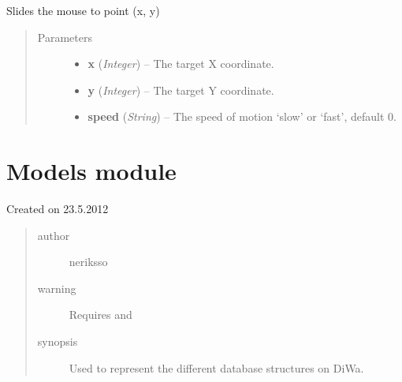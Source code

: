 \documentclass[letterpaper,10pt,english]{sphinxmanual}
\begin{document}

\begin{fulllineitems}
\label{macro:macro.SlideTo}
Slides the mouse to point (x, y)
\begin{quote}\begin{description}
\item[{Parameters}] \leavevmode\begin{itemize}
\item {} 
\textbf{x} (\emph{Integer}) -- The target X coordinate.

\item {} 
\textbf{y} (\emph{Integer}) -- The target Y coordinate.

\item {} 
\textbf{speed} (\emph{String}) -- The speed of motion `slow' or `fast', default 0.

\end{itemize}

\end{description}\end{quote}

\end{fulllineitems}



\section{Models module}
\label{models:module-models}\label{models::doc}\label{models:models-module}
Created on 23.5.2012
\begin{quote}\begin{description}
\item[{author}] \leavevmode
neriksso

\item[{warning}] \leavevmode
Requires  and 

\item[{synopsis}] \leavevmode
Used to represent the different database structures on DiWa.

\end{description}\end{quote}
\end{document}
